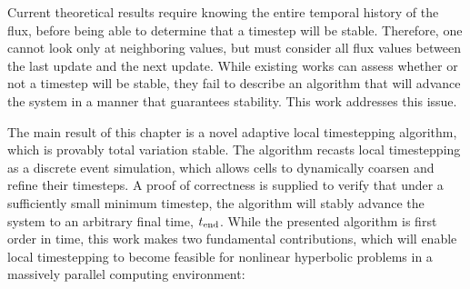 Current theoretical results require knowing the entire temporal history of the flux, before being able to determine that a timestep will be stable. Therefore, one cannot look only at neighboring values, but must consider all flux values between the last update and the next update. While existing works can assess whether or not a timestep will be stable, they fail to describe an algorithm that will advance the system in a manner that guarantees stability. This work addresses this issue.


The main result of this chapter is a novel adaptive local timestepping algorithm, which is provably total variation stable. The algorithm recasts local timestepping as a discrete event simulation, which allows cells to dynamically coarsen and refine their timesteps. A proof of correctness is supplied to verify that under a sufficiently small minimum timestep, the algorithm will stably advance the system to an arbitrary final time, $t_{\text{end}}$. While the presented algorithm is first order in time, this work makes two fundamental contributions, which will enable local timestepping to become feasible for nonlinear hyperbolic problems in a massively parallel computing environment:
